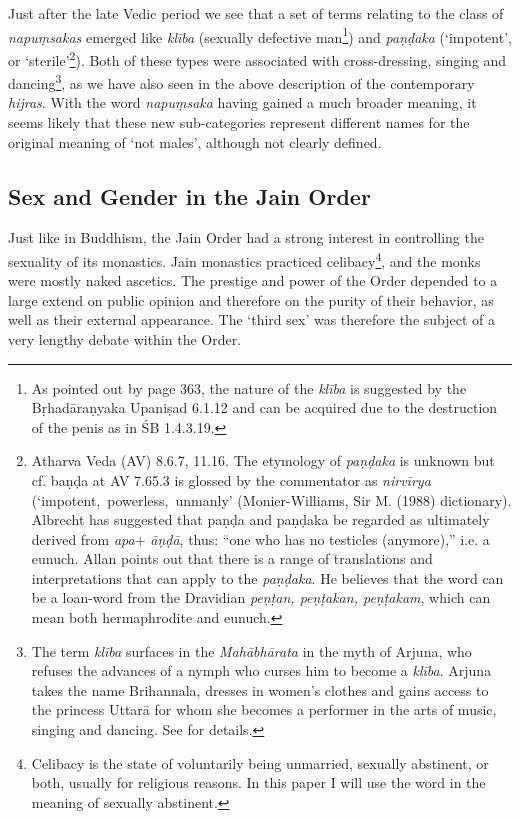 Just after the late Vedic period we see that a set of terms relating to the class of {\em napuṃsakas} emerged like {\em klība} (sexually defective man\footnote{As pointed out by \cite{zwilling} page 363, the nature of the {\em klība} is suggested by the Bṛhadāraṇyaka Upaniṣad 6.1.12 and can be acquired due to the destruction of the penis as in ŚB 1.4.3.19.}) and {\em paṇḍaka} (`impotent', or `sterile'\footnote{Atharva Veda (AV) 8.6.7, 11.16. The etymology of {\em paṇḍaka} is unknown but cf. baṇḍa at AV 7.65.3 is glossed by the commentator as {\em nirvīrya} (`impotent, powerless, unmanly' (Monier-Williams, Sir M. (1988) dictionary). Albrecht \cite{wezler} has suggested that paṇḍa and paṇḍaka be regarded as ultimately derived from {\em *apa}+ {\em āṇḍā}, thus: “one who has no testicles (anymore),” i.e. a eunuch. Allan \cite{bomhard} points out that there is a range of translations and interpretations that can apply to the {\em paṇḍaka}. He believes that the word can be a loan-word from the Dravidian {\em peṇṭan, peṇṭakan, peṇṭakam}, which can mean both hermaphrodite and eunuch.}). Both of these types were associated with cross-dressing, singing and dancing\footnote{The term {\em klība} surfaces in the {\em Mahābhārata} in the myth of Arjuna, who refuses the advances of a nymph who curses him to become a {\em klība}. Arjuna takes the name Brihannala, dresses in women's clothes and gains access to the princess Uttarā for whom she becomes a performer in the arts of music, singing and dancing. See \cite{cassell} for details.}, as we have also seen in the above description of the contemporary {\em hijras}. With the word {\em napuṃsaka} having gained a much broader meaning, it seems likely that these new sub-categories represent different names for the original meaning of `not males', although not clearly defined.


\subsection{Sex and Gender in the Jain Order}
Just like in Buddhism, the Jain Order had a strong interest in controlling the sexuality of its monastics. Jain monastics practiced celibacy\footnote{Celibacy is the state of voluntarily being unmarried, sexually abstinent, or both, usually for religious reasons. In this paper I will use the word in the meaning of sexually abstinent.}, and the monks were mostly naked ascetics. The prestige and power of the Order depended to a large extend on public opinion and therefore on the purity of their behavior, as well as their external appearance. The `third sex' was therefore the subject of a very lengthy debate within the Order. 

